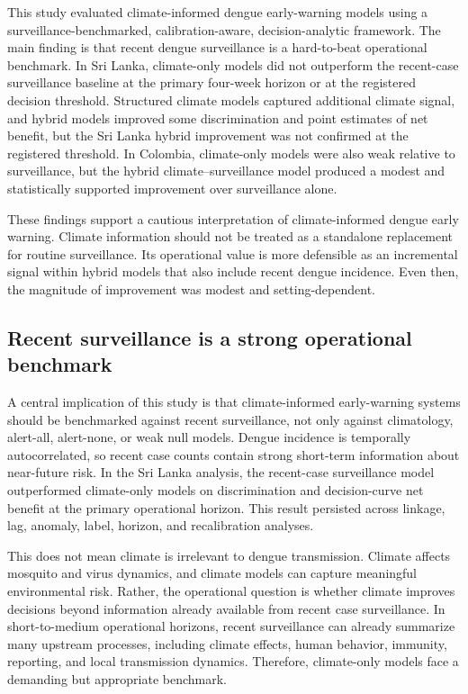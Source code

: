 \documentclass[11pt,a4paper]{article}
\begin{document}
This study evaluated climate-informed dengue early-warning models using a surveillance-benchmarked, calibration-aware, decision-analytic framework. The main finding is that recent dengue surveillance is a hard-to-beat operational benchmark. In Sri Lanka, climate-only models did not outperform the recent-case surveillance baseline at the primary four-week horizon or at the registered decision threshold. Structured climate models captured additional climate signal, and hybrid models improved some discrimination and point estimates of net benefit, but the Sri Lanka hybrid improvement was not confirmed at the registered threshold. In Colombia, climate-only models were also weak relative to surveillance, but the hybrid climate--surveillance model produced a modest and statistically supported improvement over surveillance alone.

These findings support a cautious interpretation of climate-informed dengue early warning. Climate information should not be treated as a standalone replacement for routine surveillance. Its operational value is more defensible as an incremental signal within hybrid models that also include recent dengue incidence. Even then, the magnitude of improvement was modest and setting-dependent.

\subsection{Recent surveillance is a strong operational benchmark}
\label{subsec:surveillance-benchmark-discussion}

A central implication of this study is that climate-informed early-warning systems should be benchmarked against recent surveillance, not only against climatology, alert-all, alert-none, or weak null models. Dengue incidence is temporally autocorrelated, so recent case counts contain strong short-term information about near-future risk. In the Sri Lanka analysis, the recent-case surveillance model outperformed climate-only models on discrimination and decision-curve net benefit at the primary operational horizon. This result persisted across linkage, lag, anomaly, label, horizon, and recalibration analyses.

This does not mean climate is irrelevant to dengue transmission. Climate affects mosquito and virus dynamics, and climate models can capture meaningful environmental risk. Rather, the operational question is whether climate improves decisions beyond information already available from recent case surveillance. In short-to-medium operational horizons, recent surveillance can already summarize many upstream processes, including climate effects, human behavior, immunity, reporting, and local transmission dynamics. Therefore, climate-only models face a demanding but appropriate benchmark.
\end{document}
